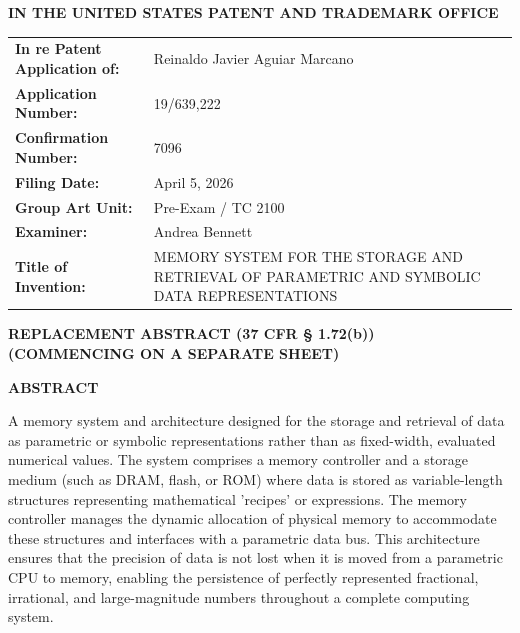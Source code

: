 \documentclass[11pt,letterpaper]{article}
\begin{document}
\thispagestyle{empty}

\begin{center}
    \large\textbf{IN THE UNITED STATES PATENT AND TRADEMARK OFFICE} \\
\end{center}

\vspace{0.3cm}
\noindent\begin{tabular}{p{2.3in}p{4.0in}}
\textbf{In re Patent Application of:} & Reinaldo Javier Aguiar Marcano \\
\textbf{Application Number:} & 19/639,222 \\
\textbf{Confirmation Number:} & 7096 \\
\textbf{Filing Date:} & April 5, 2026 \\
\textbf{Group Art Unit:} & Pre-Exam / TC 2100 \\
\textbf{Examiner:} & Andrea Bennett \\
\textbf{Title of Invention:} & MEMORY SYSTEM FOR THE STORAGE AND RETRIEVAL OF PARAMETRIC AND SYMBOLIC DATA REPRESENTATIONS \\
\end{tabular}

\vspace{0.8cm}
\begin{center}
    \textbf{\large REPLACEMENT ABSTRACT (37 CFR \S{} 1.72(b))} \\
    \textbf{(COMMENCING ON A SEPARATE SHEET)}
\end{center}

\vspace{0.5cm}

\begin{center}
    \textbf{ABSTRACT}
\end{center}

A memory system and architecture designed for the storage and retrieval of data as parametric or symbolic representations rather than as fixed-width, evaluated numerical values. The system comprises a memory controller and a storage medium (such as DRAM, flash, or ROM) where data is stored as variable-length structures representing mathematical 'recipes' or expressions. The memory controller manages the dynamic allocation of physical memory to accommodate these structures and interfaces with a parametric data bus. This architecture ensures that the precision of data is not lost when it is moved from a parametric CPU to memory, enabling the persistence of perfectly represented fractional, irrational, and large-magnitude numbers throughout a complete computing system.
\end{document}
